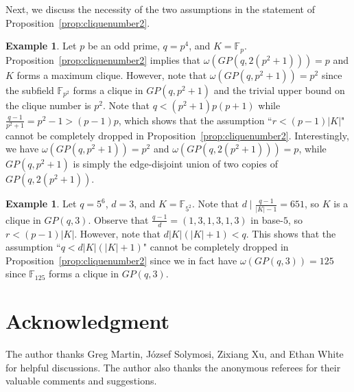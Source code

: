 \documentclass[12pt,reqno]{amsart}
\theoremstyle{definition}
\newtheorem{ex}[thm]{Example}
\newcommand{\F}{\mathbb{F}}
\begin{document}
Next, we discuss the necessity of the two assumptions in the statement of Proposition~\ref{prop:cliquenumber2}. 


\begin{ex}
Let $p$ be an odd prime, $q=p^4$, and $K=\F_p$. Proposition~\ref{prop:cliquenumber2} implies that $\omega(GP(q, 2(p^2+1)))=p$ and $K$ forms a maximum clique. However, note that $\omega(GP(q, p^2+1))=p^2$ since the subfield $\F_{p^2}$ forms a clique in $GP(q,p^2+1)$ and the trivial upper bound on the clique number is $p^2$. Note that $q<(p^2+1)p(p+1)$ while $\frac{q-1}{p^2+1}=p^2-1>(p-1)p$, which shows that the assumption ``$r<(p-1)|K|$" cannot be completely dropped in  Proposition~\ref{prop:cliquenumber2}. Interestingly, we have $\omega(GP(q, p^2+1))=p^2$ and $\omega(GP(q, 2(p^2+1)))=p$, while $GP(q, p^2+1)$ is simply the edge-disjoint union of two copies of $GP(q, 2(p^2+1))$.
\end{ex}

\begin{ex}
Let $q=5^6$, $d=3$, and $K=\F_{5^2}$. Note that $d \mid \frac{q-1}{|K|-1}=651$, so $K$ is a clique in $GP(q,3)$. Observe that $\frac{q-1}{d}=(1,3,1,3,1,3)$ in base-$5$, so $r<(p-1)|K|$. However, note that $d|K|(|K|+1)<q$. This shows that the assumption ``$q<d|K|(|K|+1)$" cannot be completely dropped in  Proposition~\ref{prop:cliquenumber2} since we in fact have $\omega(GP(q,3))=125$ since $\F_{125}$ forms a clique in $GP(q,3)$.
\end{ex}

\section*{Acknowledgment}
The author thanks Greg Martin, J\'ozsef Solymosi, Zixiang Xu, and Ethan White for helpful discussions. The author also thanks the anonymous referees for their valuable comments and suggestions.




\end{document}
